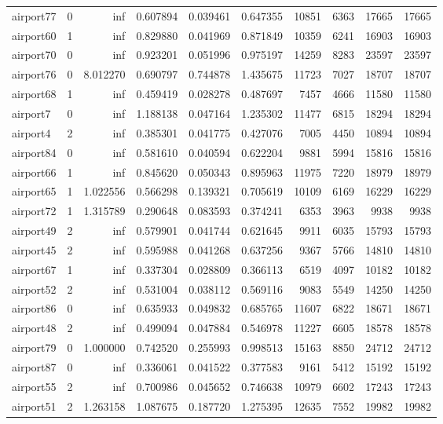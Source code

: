 \begin{longtable}{|l|r|r|r|r|r|r|r|r|r|}
airport77 & 0 & inf & 0.607894 & 0.039461 & 0.647355 & 10851 & 6363 & 17665 & 17665 \\
airport60 & 1 & inf & 0.829880 & 0.041969 & 0.871849 & 10359 & 6241 & 16903 & 16903 \\
airport70 & 0 & inf & 0.923201 & 0.051996 & 0.975197 & 14259 & 8283 & 23597 & 23597 \\
airport76 & 0 & 8.012270 & 0.690797 & 0.744878 & 1.435675 & 11723 & 7027 & 18707 & 18707 \\
airport68 & 1 & inf & 0.459419 & 0.028278 & 0.487697 & 7457 & 4666 & 11580 & 11580 \\
airport7 & 0 & inf & 1.188138 & 0.047164 & 1.235302 & 11477 & 6815 & 18294 & 18294 \\
airport4 & 2 & inf & 0.385301 & 0.041775 & 0.427076 & 7005 & 4450 & 10894 & 10894 \\
airport84 & 0 & inf & 0.581610 & 0.040594 & 0.622204 & 9881 & 5994 & 15816 & 15816 \\
airport66 & 1 & inf & 0.845620 & 0.050343 & 0.895963 & 11975 & 7220 & 18979 & 18979 \\
airport65 & 1 & 1.022556 & 0.566298 & 0.139321 & 0.705619 & 10109 & 6169 & 16229 & 16229 \\
airport72 & 1 & 1.315789 & 0.290648 & 0.083593 & 0.374241 & 6353 & 3963 & 9938 & 9938 \\
airport49 & 2 & inf & 0.579901 & 0.041744 & 0.621645 & 9911 & 6035 & 15793 & 15793 \\
airport45 & 2 & inf & 0.595988 & 0.041268 & 0.637256 & 9367 & 5766 & 14810 & 14810 \\
airport67 & 1 & inf & 0.337304 & 0.028809 & 0.366113 & 6519 & 4097 & 10182 & 10182 \\
airport52 & 2 & inf & 0.531004 & 0.038112 & 0.569116 & 9083 & 5549 & 14250 & 14250 \\
airport86 & 0 & inf & 0.635933 & 0.049832 & 0.685765 & 11607 & 6822 & 18671 & 18671 \\
airport48 & 2 & inf & 0.499094 & 0.047884 & 0.546978 & 11227 & 6605 & 18578 & 18578 \\
airport79 & 0 & 1.000000 & 0.742520 & 0.255993 & 0.998513 & 15163 & 8850 & 24712 & 24712 \\
airport87 & 0 & inf & 0.336061 & 0.041522 & 0.377583 & 9161 & 5412 & 15192 & 15192 \\
airport55 & 2 & inf & 0.700986 & 0.045652 & 0.746638 & 10979 & 6602 & 17243 & 17243 \\
airport51 & 2 & 1.263158 & 1.087675 & 0.187720 & 1.275395 & 12635 & 7552 & 19982 & 19982 \\

\end{longtable}
